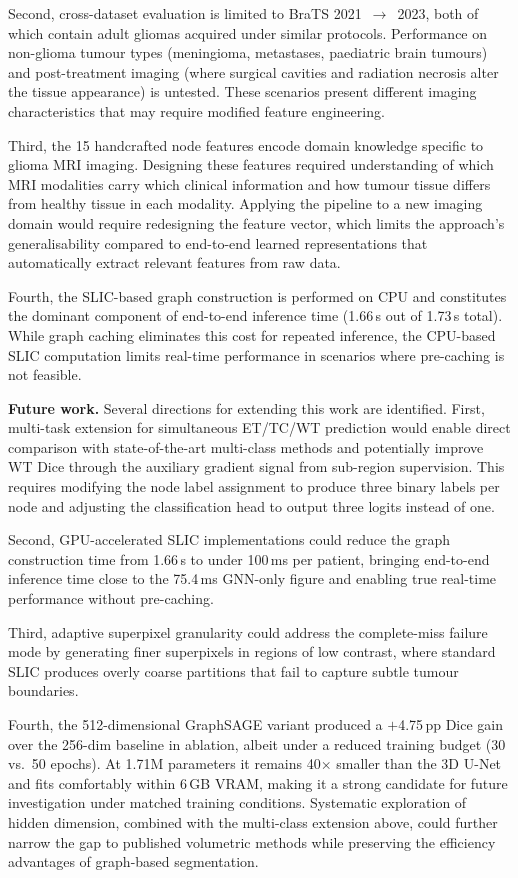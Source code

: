 \documentclass{article}
\begin{document}
Second, cross-dataset evaluation is limited to BraTS 2021~$\rightarrow$~2023, both
of which contain adult gliomas acquired under similar protocols. Performance on
non-glioma tumour types (meningioma, metastases, paediatric brain tumours) and
post-treatment imaging (where surgical cavities and radiation necrosis alter the
tissue appearance) is untested. These scenarios present different imaging
characteristics that may require modified feature engineering.

Third, the 15 handcrafted node features encode domain knowledge specific to glioma
MRI imaging. Designing these features required understanding of which MRI modalities
carry which clinical information and how tumour tissue differs from healthy tissue
in each modality. Applying the pipeline to a new imaging domain would require
redesigning the feature vector, which limits the approach's generalisability
compared to end-to-end learned representations that automatically extract relevant
features from raw data.

Fourth, the SLIC-based graph construction is performed on CPU and constitutes the
dominant component of end-to-end inference time (1.66\,s out of 1.73\,s total).
While graph caching eliminates this cost for repeated inference, the CPU-based SLIC
computation limits real-time performance in scenarios where pre-caching is not
feasible.

\textbf{Future work.}
Several directions for extending this work are identified. First, multi-task
extension for simultaneous ET/TC/WT prediction would enable direct comparison
with state-of-the-art multi-class methods and potentially improve WT Dice through
the auxiliary gradient signal from sub-region supervision. This requires modifying
the node label assignment to produce three binary labels per node and adjusting the
classification head to output three logits instead of one.

Second, GPU-accelerated SLIC implementations could reduce the graph construction
time from 1.66\,s to under 100\,ms per patient, bringing end-to-end inference time
close to the 75.4\,ms GNN-only figure and enabling true real-time performance
without pre-caching.

Third, adaptive superpixel granularity could address the complete-miss failure mode
by generating finer superpixels in regions of low contrast, where standard SLIC
produces overly coarse partitions that fail to capture subtle tumour boundaries.

Fourth, the 512-dimensional GraphSAGE variant produced a $+$4.75\,pp Dice gain
over the 256-dim baseline in ablation, albeit under a reduced training budget
(30 vs.\ 50 epochs). At 1.71M parameters it remains 40$\times$ smaller than the
3D U-Net and fits comfortably within 6\,GB VRAM, making it a strong candidate for
future investigation under matched training conditions. Systematic exploration of
hidden dimension, combined with the multi-class extension above, could further
narrow the gap to published volumetric methods while preserving the efficiency
advantages of graph-based segmentation.
\end{document}
